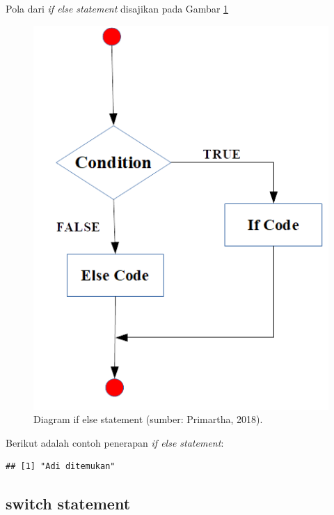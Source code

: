 \documentclass[]{book}
\newenvironment{Shaded}{\begin{snugshade}}{\end{snugshade}}
\newcommand{\ControlFlowTok}[1]{\textcolor[rgb]{0.13,0.29,0.53}{\textbf{#1}}}
\newcommand{\KeywordTok}[1]{\textcolor[rgb]{0.13,0.29,0.53}{\textbf{#1}}}
\newcommand{\NormalTok}[1]{#1}
\newcommand{\OperatorTok}[1]{\textcolor[rgb]{0.81,0.36,0.00}{\textbf{#1}}}
\newcommand{\StringTok}[1]{\textcolor[rgb]{0.31,0.60,0.02}{#1}}
\theoremstyle{definition}
\theoremstyle{definition}
\theoremstyle{definition}
\theoremstyle{remark}
\begin{document}
Pola dari \emph{if else statement} disajikan pada Gambar \ref{fig:ifelse}

\begin{figure}

{\centering \includegraphics[width=0.4\linewidth]{./images/ifelse} 

}

\caption{Diagram if else statement (sumber: Primartha, 2018).}\label{fig:ifelse}
\end{figure}

Berikut adalah contoh penerapan \emph{if else statement}:

\begin{Shaded}
\end{Shaded}

\begin{verbatim}
## [1] "Adi ditemukan"
\end{verbatim}

\hypertarget{switchstatement}{%
\subsection{switch statement}\label{switchstatement}}
\end{document}
